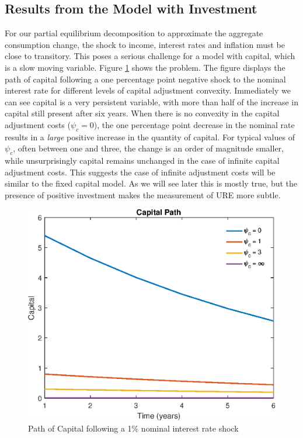 \documentclass[titlepage]{\econtex}\newcommand{\texname}{ConsumptionHeterogeneity}
\begin{document}
\subsection{Results from the Model with Investment}
For our partial equilibrium decomposition to approximate the aggregate consumption change, the shock to income, interest rates and inflation must be close to transitory. This poses a serious challenge for a model with capital, which is a slow moving variable. Figure \ref{fig:PathCap} shows the problem. The figure displays the path of capital following a one percentage point negative shock to the nominal interest rate for different levels of capital adjustment convexity. Immediately we can see capital is a very persistent variable, with more than half of the increase in capital still present after six years. When there is no convexity in the capital adjustment costs ($\psi_c = 0$), the one percentage point decrease in the nominal rate results in a \textit{large} positive increase in the quantity of capital. For typical values of $\psi_c$, often between one and three, the change is an order of magnitude smaller, while unsurprisingly capital remains unchanged in the case of infinite capital adjustment costs. This suggests the case of infinite adjustment costs will be similar to the fixed capital model. As we will see later this is mostly true, but the presence of positive investment makes the measurement of URE more subtle.

\begin{figure} 
	\begin{centering}
		\includegraphics[scale=0.7]{../Matlab/DynareCode/Figures/TANK_capital_IRF_k.eps}
		\caption{Path of Capital following a 1\% nominal interest rate shock}
		\label{fig:PathCap}
	\end{centering}
\end{figure}
\end{document}
